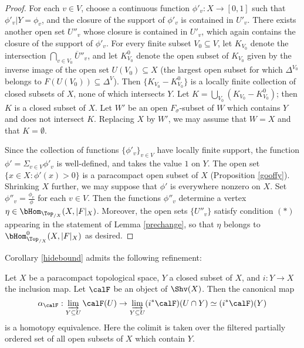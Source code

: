 \begin{proof}
For each $v \in V$, choose a continuous function $\phi'_{v}: X \rightarrow [0,1]$ such that
$\phi'_{v} | Y = \phi_{v}$, and the closure of the support of $\phi'_{v}$ is contained in
$U'_{v}$. There exists another open set $U''_{v}$ whose closure is contained in $U'_{v}$, which again contains the closure of the support of $\phi'_{v}$. For every finite subset $V_0 \subseteq V$, let
$K_{V_0}$ denote the intersection $\bigcap_{v \in V_0} \overline{ U}''_{v}$, and let
$K^{0}_{V_0}$ denote the open subset of $K_{V_0}$ given by the inverse image of the
open set $U(V_0) \subseteq X$ (the largest open subset for which
$\Delta^{V_0}$ belongs to $F( U(V_0) ) \subseteq \Delta^V$). Then
$\{ K_{V_0} - K^{0}_{V_0} \}$ is a locally finite collection of closed subsets of $X$, none of which intersects $Y$. Let $K = \bigcup_{V_0}(K_{V_0} - K^{0}_{V_0})$; then $K$ is a closed subset
of $X$. Let $W'$ be an open $F_{\sigma}$-subset of $W$ which contains $Y$ and does not intersect $K$. Replacing $X$ by $W'$, we may assume that
$W = X$ and that $K = \emptyset$.

Since the collection of functions $\{ \phi'_{v} \}_{v \in V}$ have locally finite support,
the function $\phi' = \Sigma_{v \in V} \phi'_{v}$ is well-defined, and takes the value
$1$ on $Y$. The open set $\{ x \in X: \phi'(x) > 0 \}$ is a paracompact open subset of $X$ (Proposition \ref{gooffy}). Shrinking $X$ further, we may suppose
that $\phi'$ is everywhere nonzero on $X$. Set $\phi''_{v} = \frac{ \phi_{v} }{\phi}$ for each
$v \in V$. Then the functions $\phi''_{v}$ determine a vertex
$\eta \in \bHom_{ \Top_{/X}}(X, |F|_X)$. Moreover, the open sets
$\{ U''_{v} \}$ satisfy condition $(\ast)$ appearing in the statement of Lemma \ref{prechange}, so that
$\eta$ belongs to $\bHom^{0}_{\Top_{/X}}( X, |F|_X)$ as desired.
\end{proof}

Corollary \ref{hidebound} admits the following refinement:

\begin{corollary}\label{snottle}
Let $X$ be a paracompact topological space, $Y$ a closed subset of $X$, and $i: Y \rightarrow X$
the inclusion map. Let $\calF$ be an object of $\Shv(X)$. Then the canonical map
$$ \alpha_{\calF}: \varinjlim_{Y \subseteq U} \calF(U) \rightarrow
\varinjlim_{Y \subseteq U} (i^{\ast} \calF)(U \cap Y) \simeq (i^{\ast} \calF)(Y)$$
is a homotopy equivalence. Here the colimit is taken over the filtered partially ordered set of
all open subsets of $X$ which contain $Y$.
\end{corollary}


